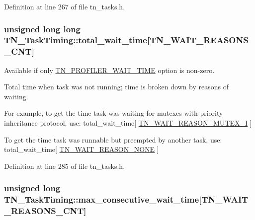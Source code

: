 Definition at line 267 of file tn\+\_\+tasks.\+h.

\hypertarget{structTN__TaskTiming_a0832c998c39b3e8400ccbb386bfbc7d9}{
\subsubsection[{total\+\_\+wait\+\_\+time}]{\setlength{\rightskip}{0pt plus 5cm}unsigned long long T\+N\+\_\+\+Task\+Timing\+::total\+\_\+wait\+\_\+time\mbox{[}{\bf T\+N\+\_\+\+W\+A\+I\+T\+\_\+\+R\+E\+A\+S\+O\+N\+S\+\_\+\+C\+N\+T}\mbox{]}}}\label{structTN__TaskTiming_a0832c998c39b3e8400ccbb386bfbc7d9}


Available if only {\ttfamily \hyperlink{tn__cfg__default_8h_a1c04db5457adb54f7cc38d42b29a5ad7}{T\+N\+\_\+\+P\+R\+O\+F\+I\+L\+E\+R\+\_\+\+W\+A\+I\+T\+\_\+\+T\+I\+M\+E}} option is non-\/zero. 

Total time when task was not running; time is broken down by reasons of waiting.

For example, to get the time task was waiting for mutexes with priority inheritance protocol, use\+: {\ttfamily total\+\_\+wait\+\_\+time\mbox{[} \hyperlink{tn__tasks_8h_a343b0332013c15d6e878c2f60ed2c9b7a7e9f9bbeea45338617a5d988fc2f4875}{T\+N\+\_\+\+W\+A\+I\+T\+\_\+\+R\+E\+A\+S\+O\+N\+\_\+\+M\+U\+T\+E\+X\+\_\+\+I} \mbox{]}}

To get the time task was runnable but preempted by another task, use\+: {\ttfamily total\+\_\+wait\+\_\+time\mbox{[} \hyperlink{tn__tasks_8h_a343b0332013c15d6e878c2f60ed2c9b7a91327db45e01ddc873b4030e5638a4a4}{T\+N\+\_\+\+W\+A\+I\+T\+\_\+\+R\+E\+A\+S\+O\+N\+\_\+\+N\+O\+N\+E} \mbox{]}} 

Definition at line 285 of file tn\+\_\+tasks.\+h.

\hypertarget{structTN__TaskTiming_abb5335583d7c59aaca03753ee121c1bb}{
\subsubsection[{max\+\_\+consecutive\+\_\+wait\+\_\+time}]{\setlength{\rightskip}{0pt plus 5cm}unsigned long T\+N\+\_\+\+Task\+Timing\+::max\+\_\+consecutive\+\_\+wait\+\_\+time\mbox{[}{\bf T\+N\+\_\+\+W\+A\+I\+T\+\_\+\+R\+E\+A\+S\+O\+N\+S\+\_\+\+C\+N\+T}\mbox{]}}}\label{structTN__TaskTiming_abb5335583d7c59aaca03753ee121c1bb}


